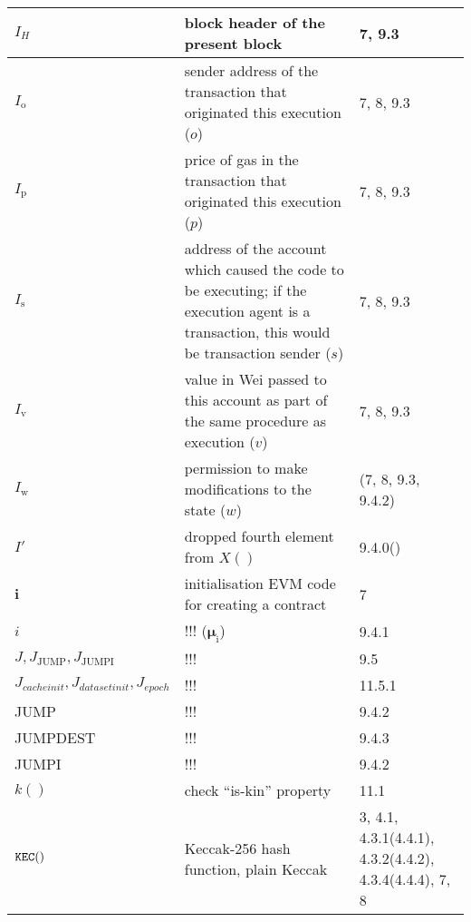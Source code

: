 \documentclass[9pt,oneside]{amsart}
\newcommand{\reff}[1]{{\footnotesize #1}}
\begin{document}
\begin{longtabu}{X[1.2lm] X[3] X}
$I_{H}$ &
block header of the present block &
\reff{7, 9.3} \\\hline

$I_{\mathrm{o}}$ &
sender address of the transaction that originated this execution ($o$) &
\reff{7, 8, 9.3} \\\hline

$I_{\mathrm{p}}$ &
price of gas in the transaction that originated this execution ($p$) &
\reff{7, 8, 9.3} \\\hline

$I_{\mathrm{s}}$ &
address of the account which caused the code to be executing; if the execution agent is a transaction, this would be transaction sender ($s$) &
\reff{7, 8, 9.3} \\\hline

$I_{\mathrm{v}}$ &
value in Wei passed to this account as part of the same procedure as execution ($v$) &
\reff{7, 8, 9.3} \\\hline

$I_{\mathrm{w}}$ &
permission to make modifications to the state ($w$) &
\reff{(7, 8, 9.3, 9.4.2)} \\\hline

$I'$ &
dropped fourth element from $X()$ &
\reff{9.4.0()} \\\hline

$\mathbf{i}$ &
initialisation EVM code for creating a contract &
\reff{7} \\\hline

$i$ &
!!! ($\boldsymbol{\mu}_{\mathrm{i}}$) &
\reff{9.4.1} \\\hline

$J, J_{\text{JUMP}}, J_{\text{JUMPI}}$ &
!!! &
\reff{9.5} \\\hline

$J_{cacheinit}, J_{datasetinit}, J_{epoch}$ &
!!! &
\reff{11.5.1} \\\hline

{\small JUMP} &
!!! &
\reff{9.4.2} \\\hline

{\small JUMPDEST} &
!!! &
\reff{9.4.3} \\\hline

{\small JUMPI} &
!!! &
\reff{9.4.2} \\\hline

$k()$ &
check ``is-kin'' property &
\reff{11.1} \\\hline

$\mathtt{\small KEC}()$ &
Keccak-256 hash function, plain Keccak &
\reff{3, 4.1, 4.3.1(4.4.1), 4.3.2(4.4.2), 4.3.4(4.4.4), 7, 8} \\\hline


\end{longtabu}
\end{document}

